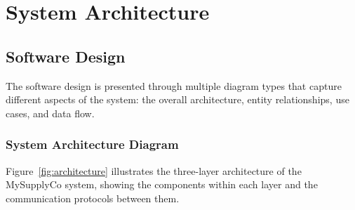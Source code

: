 \section{System Architecture}

\subsection{Software Design}

The software design is presented through multiple diagram types that capture different aspects of the system: the overall architecture, entity relationships, use cases, and data flow.

\subsubsection{System Architecture Diagram}

Figure~\ref{fig:architecture} illustrates the three-layer architecture of the MySupplyCo system, showing the components within each layer and the communication protocols between them.

